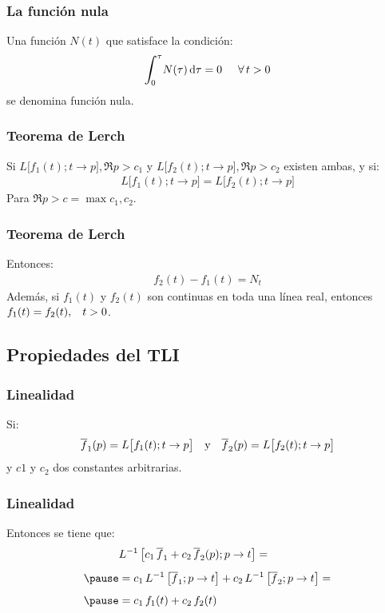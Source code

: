 \begin{frame}
\frametitle{La función nula}
 \pause Una función $N (t)$ que satisface la condición:
\pause
\begin{align*}
\scaleint{6ex}_{\bs 0}^{\tau} N (\tau) \dd{\tau} = 0 \hspace{0.5cm} \forall \, t > 0
\end{align*}
se denomina función nula.
\end{frame}
\begin{frame}
\frametitle{Teorema de Lerch}
Si $L \big[ f_{1} (t); t \to p \big], \Re {p} > c_{1}$ y $L \big[ f_{2} (t); t \to p \big], \Re {p} > c_{2}$ existen ambas, y si:
\pause
\begin{align*}
L \big[ f_{1} (t); t \to p \big] = L \big[ f_{2} (t); t \to p \big]
\end{align*}
Para $\Re{p} > c = \max{c_{1},c_{2}}$.
\end{frame}
\begin{frame}
\frametitle{Teorema de Lerch}
Entonces:
\pause
\begin{align*}
f_{2} (t) - f_{1} (t) = N_{t}
\end{align*}
\pause
Además, si $f_{1} (t)$ y $f_{2} (t)$ son continuas en toda una línea real, entonces $f_{1} (t) = f_{2} (t), \hspace{0.3cm} t > 0$.
\end{frame}

\subsection{Propiedades del TLI}

\begin{frame}
\frametitle{Linealidad}
Si:
\pause
\begin{align*}
\overline{f}_{1} (p) = L \big[ f_{1} (t); t \to p \big] \hspace{0.35cm} \mbox{y} \hspace{0.35cm} \overline{f}_{2} (p) = L \big[ f_{2} (t); t \to p \big]
\end{align*}
y $c{1}$ y $c_{2}$ dos constantes arbitrarias.
\end{frame}
\begin{frame}
\frametitle{Linealidad}
Entonces se tiene que:
\pause
\begin{eqnarray*}
\begin{aligned}
&L^{-1} \, \big[  c_{1} \, \overline{f}_{1} + c_{2} \, \overline{f}_{2} (p); p \to t \big] = \\[0.5em] \pause
&= c_{1} \, L^{-1} \, \big[  \overline{f}_{1}; p \to t \big] + c_{2} \, L^{-1} \, \big[  \overline{f}_{2}; p \to t \big] = \\[0.5em] \pause
&= c_{1} \, f_{1} (t) + c_{2} \, f_{2} (t)
\end{aligned}
\end{eqnarray*}
\end{frame}

